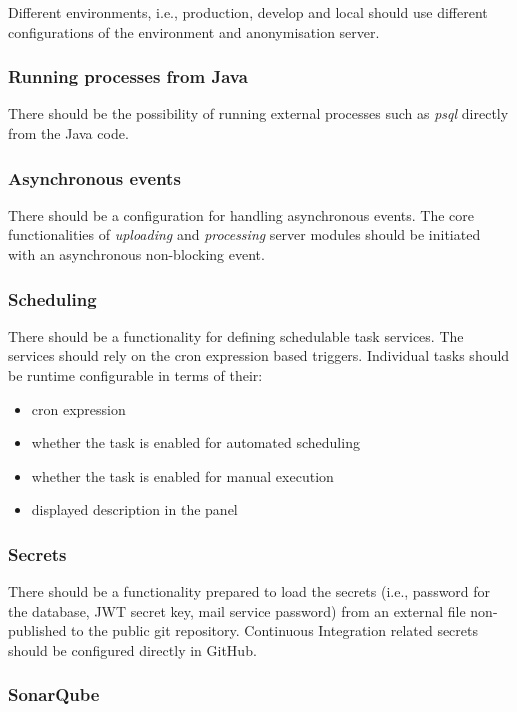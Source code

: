 \documentclass[a4paper,twoside,12pt]{book}
\begin{document}
Different environments, i.e., production, develop and local should use different configurations of the environment and anonymisation server.

\subsubsection{Running processes from Java}

There should be the possibility of running external processes such as \textit{psql} directly from the Java code.

\subsubsection{Asynchronous events}

There should be a configuration for handling asynchronous events. The core functionalities of \textit{uploading} and \textit{processing} server modules should be initiated with an asynchronous non-blocking event.

\subsubsection{Scheduling}

There should be a functionality for defining schedulable task services. The services should rely on the cron expression based triggers. Individual tasks should be runtime configurable in terms of their:

\begin{itemize}
\item cron expression
\item whether the task is enabled for automated scheduling
\item whether the task is enabled for manual execution
\item displayed description in the panel
\end{itemize}

\subsubsection{Secrets}

There should be a functionality prepared to load the secrets (i.e., password for the database, JWT secret key, mail service password) from an external file non-published to the public git repository. Continuous Integration related secrets should be configured directly in GitHub.

\subsubsection{SonarQube}
\end{document}

